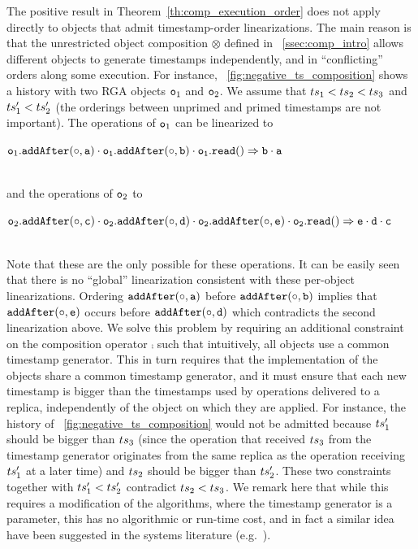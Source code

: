 The positive result in Theorem~\ref{th:comp_execution_order} does not apply directly to objects that admit timestamp-order linearizations. The main reason is that the unrestricted object composition $\otimes$ defined in \sectionautorefname~\ref{ssec:comp_intro} allows different objects to generate timestamps independently, and in ``conflicting'' orders along some execution. For instance, \figureautorefname~\ref{fig:negative_ts_composition} shows a history with two RGA objects $\mathtt{o}_1$ and $\mathtt{o}_2$. We assume that $ts_1 < ts_2 < ts_3$ and $ts'_1 < ts'_2$ (the orderings between unprimed and primed timestamps are not important). The operations of $\mathtt{o}_1$ can be linearized to\\[3pt]
\centerline{
\(
\aobj_1.\alabelshort[{\tt addAfter}]{\circ,a}\cdot \aobj_1.\alabelshort[{\tt addAfter}]{\circ,b}\cdot \aobj_1.\alabellongind[{\tt read}]{}{b\cdot a}{}
\)
}\\[3pt]
and the operations of $\mathtt{o}_2$ to\\[3pt]
\centerline{
\(
\aobj_2.\alabelshort[{\tt addAfter}]{\circ,c}\cdot \aobj_2.\alabelshort[{\tt addAfter}]{\circ,d}\cdot \aobj_2.\alabelshort[{\tt addAfter}]{\circ,e}\cdot \aobj_2.\alabellongind[{\tt read}]{}{e\cdot d\cdot c}{}
\)
}\\[3pt]
Note that these are the only  possible for these operations. It can be easily seen that there is no ``global'' linearization consistent with these per-object linearizations. Ordering $\alabelshort[{\tt addAfter}]{\circ,a}$ before $\alabelshort[{\tt addAfter}]{\circ,b}$ implies that $\alabelshort[{\tt addAfter}]{\circ,e}$ occurs before $\alabelshort[{\tt addAfter}]{\circ,d}$ which contradicts the second linearization above.
We solve this problem by requiring an additional constraint on the composition operator $\comp$ such that intuitively, all objects use a common timestamp generator. This in turn requires that the implementation of the objects share a common timestamp generator, and it must ensure that each new timestamp is bigger than the  timestamps used by operations delivered to a replica, independently of the object on which they are applied. For instance, the history of \figureautorefname~\ref{fig:negative_ts_composition} would not be admitted because $ts_1'$ should be bigger than $ts_3$ (since the operation that received $ts_3$ from the timestamp generator originates from the same replica as the operation receiving $ts_1'$ at a later time) and $ts_2$ should be bigger than $ts_2'$. These two constraints together with $ts_1'<ts_2'$ contradict $ts_2 < ts_3$.
%
We remark here that while this requires a modification of the algorithms, where the timestamp generator is a parameter, this has no algorithmic or run-time cost, and in fact a similar idea have been suggested in the systems literature (e.g.~\cite{EnesPB17}).

